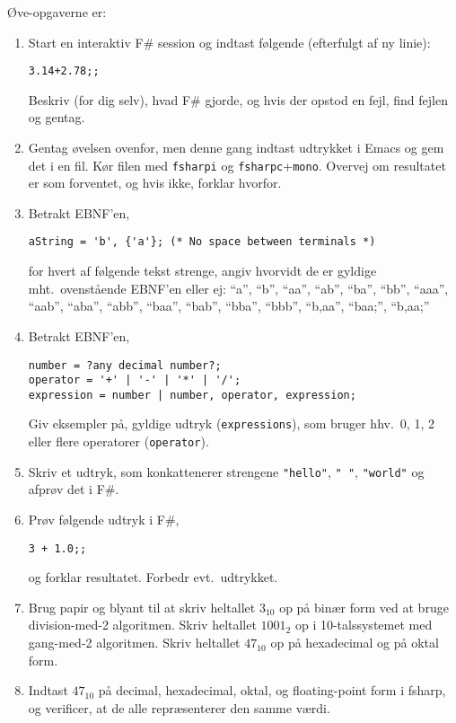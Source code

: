 \documentclass[a4paper,12pt]{article}
\begin{document}
Øve-opgaverne er:
\begin{enumerate}[label=2ø.\arabic*,start=0]
\item Start en interaktiv F\# session og indtast følgende (efterfulgt af ny linie):
\begin{lstlisting}
3.14+2.78;;
\end{lstlisting}
Beskriv (for dig selv), hvad F\# gjorde, og hvis der opstod en fejl, find fejlen og gentag.
\item Gentag øvelsen ovenfor, men denne gang indtast udtrykket i Emacs og gem det i en fil. Kør filen med \lstinline[language=console]{fsharpi} og \lstinline[language=console]{fsharpc}+\lstinline[language=console]{mono}. Overvej om resultatet er som forventet, og hvis ikke, forklar hvorfor.
\item Betrakt EBNF'en,
\begin{lstlisting}[language=ebnf]
aString = 'b', {'a'}; (* No space between terminals *)
\end{lstlisting}
for hvert af følgende tekst strenge, angiv hvorvidt de er gyldige mht.\ ovenstående EBNF'en eller ej: "`a"', "`b"', "`aa"', "`ab"', "`ba"', "`bb"', "`aaa"', "`aab"', "`aba"', "`abb"', "`baa"', "`bab"', "`bba"', "`bbb"', "`b,aa"', "`baa;"', "`b,aa;"'
\item Betrakt EBNF'en,
\begin{lstlisting}[language=ebnf]
number = ?any decimal number?;
operator = '+' | '-' | '*' | '/';
expression = number | number, operator, expression;
\end{lstlisting}
Giv eksempler på,  gyldige udtryk (\lstinline[language=ebnf]{expressions}), som bruger hhv.\ 0, 1, 2 eller flere operatorer (\lstinline[language=ebnf]{operator}).
\item Skriv et udtryk, som konkattenerer strengene \lstinline{"hello"}, \lstinline{" "}, \lstinline{"world"} og afprøv det i F\#.
\item Prøv følgende udtryk i F\#,
\begin{lstlisting}
3 + 1.0;;
\end{lstlisting}
og forklar resultatet. Forbedr evt.\ udtrykket.
\item Brug papir og blyant til at skriv heltallet $3_{10}$ op på binær form ved at bruge division-med-2 algoritmen. Skriv heltallet $1001_2$ op i 10-talssystemet med gang-med-2 algoritmen. Skriv heltallet $47_{10}$ op på hexadecimal og på oktal form.
\item Indtast $47_{10}$ på decimal, hexadecimal, oktal, og floating-point form i fsharp, og verificer, at de alle repræsenterer den samme værdi.

\end{enumerate}
\end{document}
